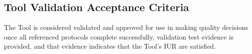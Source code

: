 \subsection{Tool Validation Acceptance Criteria}
The Tool is considered validated and approved for use in making quality decisions
once all referenced protocols complete successfully, validation test evidence
is provided, and that evidence indicates that the Tool's IUR are satisfied.
